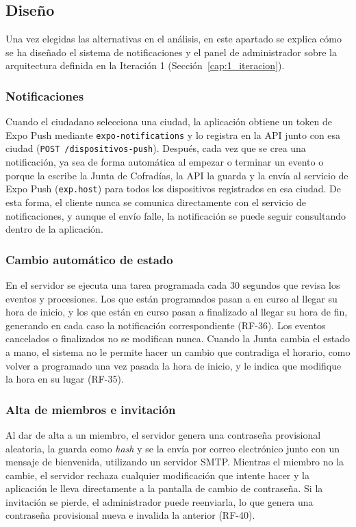 \subsection{Diseño}

Una vez elegidas las alternativas en el análisis, en este apartado se explica cómo se ha diseñado el sistema de notificaciones y el panel de administrador sobre la arquitectura definida en la Iteración 1 (Sección~\ref{cap:1_iteracion}).

\subsubsection{Notificaciones}

Cuando el ciudadano selecciona una ciudad, la aplicación obtiene un token de Expo Push mediante \texttt{expo-notifications} y lo registra en la API junto con esa ciudad (\texttt{POST /dispositivos-push}). Después, cada vez que se crea una notificación, ya sea de forma automática al empezar o terminar un evento o porque la escribe la Junta de Cofradías, la API la guarda y la envía al servicio de Expo Push (\texttt{exp.host}) para todos los dispositivos registrados en esa ciudad. De esta forma, el cliente nunca se comunica directamente con el servicio de notificaciones, y aunque el envío falle, la notificación se puede seguir consultando dentro de la aplicación.

\subsubsection{Cambio automático de estado}

En el servidor se ejecuta una tarea programada cada 30 segundos que revisa los eventos y procesiones. Los que están programados pasan a en curso al llegar su hora de inicio, y los que están en curso pasan a finalizado al llegar su hora de fin, generando en cada caso la notificación correspondiente (RF-36). Los eventos cancelados o finalizados no se modifican nunca. Cuando la Junta cambia el estado a mano, el sistema no le permite hacer un cambio que contradiga el horario, como volver a programado una vez pasada la hora de inicio, y le indica que modifique la hora en su lugar (RF-35).

\subsubsection{Alta de miembros e invitación}

Al dar de alta a un miembro, el servidor genera una contraseña provisional aleatoria, la guarda como \emph{hash} y se la envía por correo electrónico junto con un mensaje de bienvenida, utilizando un servidor SMTP. Mientras el miembro no la cambie, el servidor rechaza cualquier modificación que intente hacer y la aplicación le lleva directamente a la pantalla de cambio de contraseña. Si la invitación se pierde, el administrador puede reenviarla, lo que genera una contraseña provisional nueva e invalida la anterior (RF-40).

